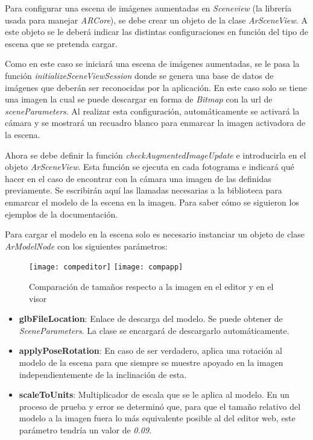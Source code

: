 Para configurar una escena de imágenes aumentadas en \textit{Sceneview} (la librería usada para manejar \textit{ARCore}), se debe crear un objeto de la clase \textit{ArSceneView}. A este objeto se le deberá indicar las distintas configuraciones en función del tipo de escena que se pretenda cargar.

Como en este caso se iniciará una escena de imágenes aumentadas, se le pasa la función \textit{initializeSceneViewSession} donde se genera una base de datos de imágenes que deberán ser reconocidas por la aplicación. En este caso solo se tiene una imagen la cual se puede descargar en forma de \textit{Bitmap} con la url de \textit{sceneParameters}. Al realizar esta configuración, automáticamente se activará la cámara y se mostrará un recuadro blanco para enmarcar la imagen activadora de la escena.

Ahora se debe definir la función \textit{checkAugmentedImageUpdate} e introducirla en el objeto \textit{ArSceneView}. Esta función se ejecuta en cada fotograma e indicará qué hacer en el caso de encontrar con la cámara una imagen de las definidas previamente. Se escribirán aquí las llamadas necesarias a la biblioteca para enmarcar el modelo de la escena en la imagen. Para saber cómo se siguieron los ejemplos de la documentación.

Para cargar el modelo en la escena solo es necesario instanciar un objeto de clase \textit{ArModelNode} con los siguientes parámetros:

\begin{figure}[h]
    \centering
    \texttt{[image: compeditor]}
    \texttt{[image: compapp]}
    \caption[Comparación de tamaños de modelo en editor y visor]{Comparación de tamaños respecto a la imagen en el editor y en el visor}
\end{figure}

\begin{itemize}
    \item \textbf{glbFileLocation}: Enlace de descarga del modelo. Se puede obtener de \textit{SceneParameters}. La clase se encargará de descargarlo automáticamente.
    \item \textbf{applyPoseRotation}: En caso de ser verdadero, aplica una rotación al modelo de la escena para que siempre se muestre apoyado en la imagen independientemente de la inclinación de esta.
    \item \textbf{scaleToUnits}: Multiplicador de escala que se le aplica al modelo. En un proceso de prueba y error se determinó que, para que el tamaño relativo del modelo a la imagen fuera lo más equivalente posible al del editor web, este parámetro tendría un valor de \textit{0.09}.
\end{itemize}

